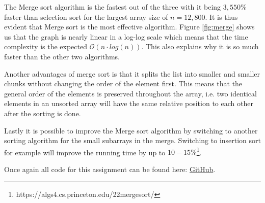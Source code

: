 \documentclass[a4paper,11pt]{article}
\begin{document}
The Merge sort algorithm is the fastest out of the three with it being $3,550\%$ faster than selection sort for the largest array size of $n=12,800$. It is thus 
evident that Merge sort is the most effective algorithm. Figure \ref{fig:merge} shows us that the graph is nearly linear in a log-log scale which means that the 
time complexity is the expected $\mathcal{O}(n\cdot log(n))$. This also explains why it is so much faster than the other two algorithms.

Another advantages of merge sort is that it splits the list into smaller and smaller chunks without changing the order of the element first. This means that the 
general order of the elements is preserved throughout the array, i.e. two identical elements in an unsorted array will have the same relative position to each 
other after the sorting is done.

Lastly it is possible to improve the Merge sort algorithm by switching to another sorting algorithm for the small subarrays in the merge. Switching to insertion sort
for example will improve the running time by up to $10-15\%$\footnote{https://algs4.cs.princeton.edu/22mergesort/}.

Once again all code for this assignment can be found here: \href{https://github.com/adrian-jonsson-sjoedin/ID1021-AlgoData/blob/main/Tasks/Sorting/src}{GitHub}.
\end{document}
